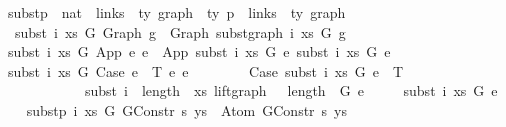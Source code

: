 \begin{isabellebody}
\ subst{\isacharunderscore}{\kern0pt}p\ {\isacharcolon}{\kern0pt}{\isacharcolon}{\kern0pt}\ {\isachardoublequoteopen}nat\ {\isacharequal}{\kern0pt}{\isachargreater}{\kern0pt}\ links\ {\isacharequal}{\kern0pt}{\isachargreater}{\kern0pt}\ {\isacharprime}{\kern0pt}ty\ graph\ {\isacharequal}{\kern0pt}{\isachargreater}{\kern0pt}\ {\isacharprime}{\kern0pt}ty\ p\ {\isacharequal}{\kern0pt}{\isachargreater}{\kern0pt}\ links\ {\isacharequal}{\kern0pt}{\isachargreater}{\kern0pt}\ {\isacharprime}{\kern0pt}ty\ graph{\isachardoublequoteclose}\isanewline
{}\isanewline
\ \ \isanewline
\ \ {\isachardoublequoteopen}subst\ i\ xs\ G\ {\isacharparenleft}{\kern0pt}Graph\ g{\isacharparenright}{\kern0pt}\ {\isacharequal}{\kern0pt}\ Graph\ {\isacharparenleft}{\kern0pt}subst{\isacharunderscore}{\kern0pt}graph\ i\ xs\ G\ g{\isacharparenright}{\kern0pt}{\isachardoublequoteclose}\isanewline
{\isacharbar}{\kern0pt}\ {\isachardoublequoteopen}subst\ i\ xs\ G\ {\isacharparenleft}{\kern0pt}App\ e{}\ e{}{\isacharparenright}{\kern0pt}\ {\isacharequal}{\kern0pt}\ App\ {\isacharparenleft}{\kern0pt}subst\ i\ xs\ G\ e{}{\isacharparenright}{\kern0pt}\ {\isacharparenleft}{\kern0pt}subst\ i\ xs\ G\ e{}{\isacharparenright}{\kern0pt}{\isachardoublequoteclose}\isanewline
{\isacharbar}{\kern0pt}\ {\isachardoublequoteopen}subst\ i\ xs\ G\ {\isacharparenleft}{\kern0pt}Case\ e{}\ {\isasymGamma}\ T\ e{}\ e{}{\isacharparenright}{\kern0pt}\ {\isacharequal}{\kern0pt}\isanewline
\ \ \ \ \ \ \ Case\ {\isacharparenleft}{\kern0pt}subst\ i\ xs\ G\ e{}{\isacharparenright}{\kern0pt}\ {\isasymGamma}\ T\isanewline
\ \ \ \ \ \ \ \ \ \ \ \ {\isacharparenleft}{\kern0pt}subst\ {\isacharparenleft}{\kern0pt}i\ {\isacharplus}{\kern0pt}\ length\ {\isasymGamma}{\isacharparenright}{\kern0pt}\ xs\ {\isacharparenleft}{\kern0pt}{\isacharparenleft}{\kern0pt}lift{\isacharunderscore}{\kern0pt}graph\ {}\ {\isacharcircum}{\kern0pt}{\isacharcircum}{\kern0pt}\ {\isacharparenleft}{\kern0pt}length\ {\isasymGamma}{\isacharparenright}{\kern0pt}{\isacharparenright}{\kern0pt}\ G{\isacharparenright}{\kern0pt}\ e{}{\isacharparenright}{\kern0pt}\isanewline
\ \ \ \ \ {\isacharparenleft}{\kern0pt}subst\ i\ xs\ G\ e{}{\isacharparenright}{\kern0pt}{\isachardoublequoteclose}\isanewline
\isanewline
\ \ \isanewline
{\isacharbar}{\kern0pt}\ {\isachardoublequoteopen}subst{\isacharunderscore}{\kern0pt}p\ i\ xs\ G\ {\isacharparenleft}{\kern0pt}GConstr\ s{\isacharparenright}{\kern0pt}\ ys\ {\isacharequal}{\kern0pt}\ Atom\ {\isacharparenleft}{\kern0pt}GConstr\ s{\isacharparenright}{\kern0pt}\ ys{\isachardoublequoteclose}\isanewline

\end{isabellebody}
